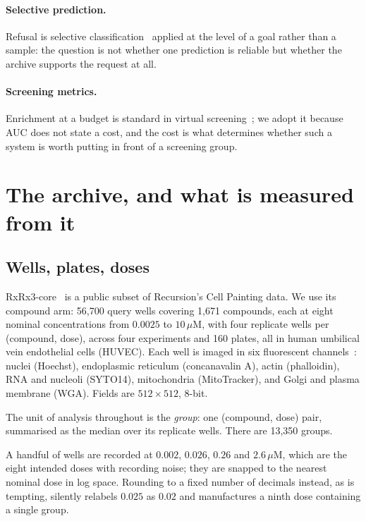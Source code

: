 \documentclass[11pt]{article}
\begin{document}
\paragraph{Selective prediction.}
Refusal is selective classification~\citep{elyaniv2010foundations,geifman2017selective}
applied at the level of a goal rather than a sample: the question is not whether one
prediction is reliable but whether the archive supports the request at all.

\paragraph{Screening metrics.}
Enrichment at a budget is standard in virtual screening~\citep{truchon2007enrichment};
we adopt it because AUC does not state a cost, and the cost is what determines whether
such a system is worth putting in front of a screening group.

\section{The archive, and what is measured from it}

\subsection{Wells, plates, doses}

RxRx3-core~\citep{kraus2025rxrx3core} is a public subset of Recursion's Cell Painting
data. We use its compound arm: 56{,}700 query wells covering 1{,}671 compounds, each at
eight nominal concentrations from $0.0025$ to $10\,\mu$M, with four replicate wells per
(compound, dose), across four experiments and 160 plates, all in human umbilical vein
endothelial cells (HUVEC). Each well is imaged in six fluorescent
channels~\citep{bray2016cellpainting}: nuclei (Hoechst), endoplasmic reticulum
(concanavalin A), actin (phalloidin), RNA and nucleoli (SYTO14), mitochondria
(MitoTracker), and Golgi and plasma membrane (WGA). Fields are $512\times512$, 8-bit.

The unit of analysis throughout is the \emph{group}: one (compound, dose) pair,
summarised as the median over its replicate wells. There are 13{,}350 groups.

A handful of wells are recorded at $0.002$, $0.026$, $0.26$ and $2.6\,\mu$M, which are
the eight intended doses with recording noise; they are snapped to the nearest nominal
dose in log space. Rounding to a fixed number of decimals instead, as is tempting,
silently relabels $0.025$ as $0.02$ and manufactures a ninth dose containing a single
group.
\end{document}
